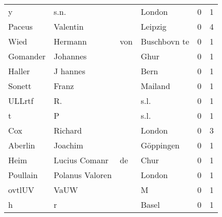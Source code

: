 \begin{tabular}{llllrr}
                        y &                               s.n. &             &                                      London &          0 &         1 \\
                   Paceus &                           Valentin &             &                                     Leipzig &          0 &         4 \\
                     Wied &                            Hermann &         von &                                Buschbovn te &          0 &         1 \\
                 Gomander &                           Johannes &             &                                        Ghur &          0 &         1 \\
                   Haller &                           J hannes &             &                                        Bern &          0 &         1 \\
                   Sonett &                              Franz &             &                                     Mailand &          0 &         1 \\
                   ULLrtf &                                 R. &             &                                        s.l. &          0 &         1 \\
                        t &                                  P &             &                                        s.l. &          0 &         1 \\
                      Cox &                            Richard &             &                                      London &          0 &         3 \\
                  Aberlin &                            Joachim &             &                                   Göppingen &          0 &         1 \\
                     Heim &                      Lucius Comanr &          de &                                        Chur &          0 &         1 \\
                 Poullain &                    Polanus Valoren &             &                                      London &          0 &         1 \\
                   ovtlUV &                               VaUW &             &                                           M &          0 &         1 \\
                        h &                                  r &             &                                       Basel &          0 &         1 \\

\end{tabular}
